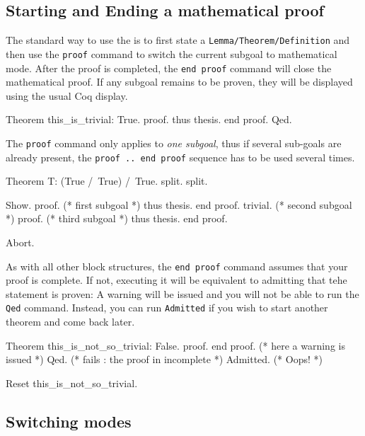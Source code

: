 \subsection{Starting and Ending a mathematical proof}


 The standard way to use the \DPL is to first state a {\texttt{Lemma/Theorem/Definition}} and then use the {\texttt{proof}} command to switch the current subgoal to mathematical mode.  After the proof is completed, the {\texttt{end proof}} command will close the mathematical proof. If any subgoal remains to be proven, they will be displayed using the usual Coq display.

\begin{coq_example}
Theorem this_is_trivial: True.
proof.
  thus thesis.
end proof.
Qed.
\end{coq_example}

The {\texttt{proof}} command only applies to \emph{one subgoal}, thus
if several sub-goals are already present, the {\texttt{proof .. end
    proof}} sequence has to be used several times.

\begin{coq_eval}
Theorem T: (True /\ True) /\ True.
  split. split.
\end{coq_eval}
\begin{coq_example}
  Show.
  proof. (* first subgoal *)
    thus thesis.
  end proof.
  trivial. (* second subgoal *)
  proof. (* third subgoal *)
    thus thesis.
  end proof.
\end{coq_example}
\begin{coq_eval}
Abort.
\end{coq_eval}

As with all other block structures, the {\texttt{end proof}} command
assumes that your proof is complete. If not, executing it will be
equivalent to admitting that tehe statement is proven: A warning will
be issued and you will not be able to run the {\texttt{Qed}}
command. Instead, you can run {\texttt{Admitted}} if you wish to start
another theorem and come back
later.

\begin{coq_example}
Theorem this_is_not_so_trivial: False.
proof.
end proof. (* here a warning is issued *)
Qed. (* fails : the proof in incomplete *)
Admitted. (* Oops! *)
\end{coq_example}
\begin{coq_eval}
Reset this_is_not_so_trivial.   
\end{coq_eval}

\subsection{Switching modes}

